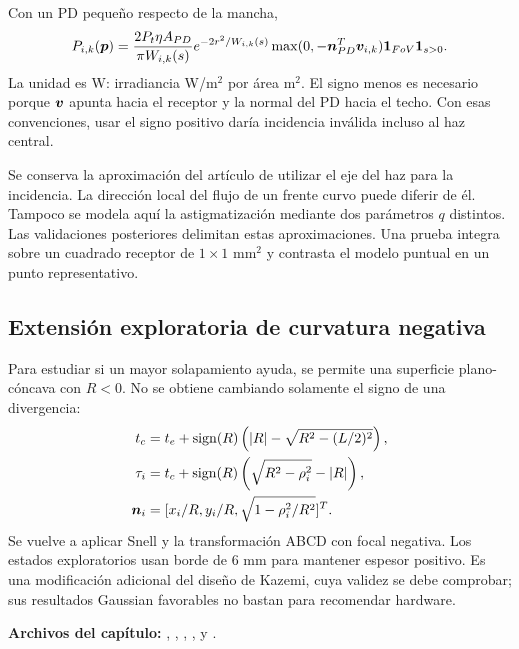 Con un PD pequeño respecto de la mancha,
\begin{equation}\label{eq:power}
P_{i,k}(\bm{p})=\frac{2P_t\eta A_{PD}}{\pi W_{i,k}(s)}
 e^{-2r^2/W_{i,k}(s)}\max(0,-\bm{n}_{PD}^T\bm{v}_{i,k})
 \mathbf 1_{FoV}\mathbf 1_{s>0}.
\end{equation}
La unidad es W: irradiancia W/m$^2$ por área m$^2$. El signo menos es necesario porque $\bm{v}$ apunta hacia el receptor y la normal del PD hacia el techo. Con esas convenciones, usar el signo positivo daría incidencia inválida incluso al haz central.

Se conserva la aproximación del artículo de utilizar el eje del haz para la incidencia. La dirección local del flujo de un frente curvo puede diferir de él. Tampoco se modela aquí la astigmatización mediante dos parámetros $q$ distintos. Las validaciones posteriores delimitan estas aproximaciones. Una prueba integra sobre un cuadrado receptor de $1\times1$ mm$^2$ y contrasta el modelo puntual en un punto representativo.

\subsection{Extensión exploratoria de curvatura negativa}
Para estudiar si un mayor solapamiento ayuda, se permite una superficie plano-cóncava con $R<0$. No se obtiene cambiando solamente el signo de una divergencia:
\begin{align}
t_c&=t_e+\operatorname{sign}(R)\left(|R|-\sqrt{R^2-(L/2)^2}\right),\\
\tau_i&=t_c+\operatorname{sign}(R)\left(\sqrt{R^2-\rho_i^2}-|R|\right),\\
\bm{n}_i&=[x_i/R,y_i/R,\sqrt{1-\rho_i^2/R^2}]^T.
\end{align}
Se vuelve a aplicar Snell y la transformación ABCD con focal negativa. Los estados exploratorios usan borde de 6 mm para mantener espesor positivo. Es una modificación adicional del diseño de Kazemi, cuya validez se debe comprobar; sus resultados Gaussian favorables no bastan para recomendar hardware.

\textbf{Archivos del capítulo:} , , , ,  y .
